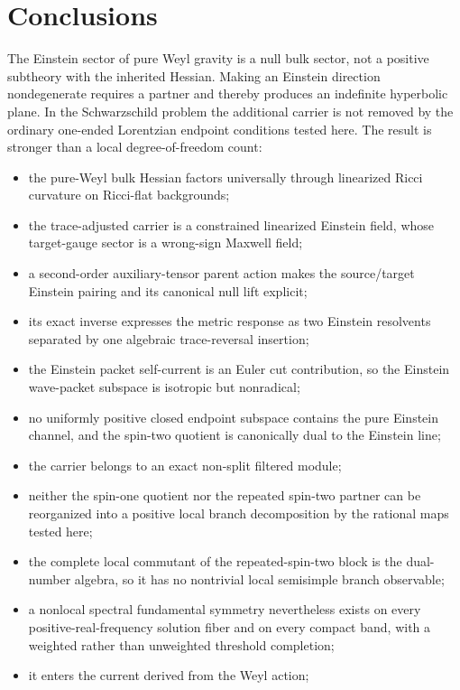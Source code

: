 \documentclass[11pt]{article}
\theoremstyle{definition}
\theoremstyle{remark}
\begin{document}
\section{Conclusions}

The Einstein sector of pure Weyl gravity is a null bulk sector, not a
positive subtheory with the inherited Hessian.  Making an Einstein direction
nondegenerate requires a partner and thereby produces an indefinite
hyperbolic plane.  In the Schwarzschild problem the additional carrier is
not removed by the ordinary one-ended Lorentzian endpoint conditions tested
here.  The result is stronger than a local degree-of-freedom count:
\begin{itemize}
\item the pure-Weyl bulk Hessian factors universally through linearized Ricci
curvature on Ricci-flat backgrounds;
\item the trace-adjusted carrier is a constrained linearized Einstein field,
whose target-gauge sector is a wrong-sign Maxwell field;
\item a second-order auxiliary-tensor parent action makes the source/target
Einstein pairing and its canonical null lift explicit;
\item its exact inverse expresses the metric response as two Einstein
resolvents separated by one algebraic trace-reversal insertion;
\item the Einstein packet self-current is an Euler cut contribution, so the
Einstein wave-packet subspace is isotropic but nonradical;
\item no uniformly positive closed endpoint subspace contains the pure
Einstein channel, and the spin-two quotient is canonically dual to the
Einstein line;
\item the carrier belongs to an exact non-split filtered module;
\item neither the spin-one quotient nor the repeated spin-two partner can be
reorganized into a positive local branch decomposition by the rational
maps tested here;
\item the complete local commutant of the repeated-spin-two block is the
dual-number algebra, so it has no nontrivial local semisimple branch
observable;
\item a nonlocal spectral fundamental symmetry nevertheless exists on every
positive-real-frequency solution fiber and on every compact band, with a
weighted rather than unweighted threshold completion;
\item it enters the current derived from the Weyl action;

\end{itemize}
\end{document}
